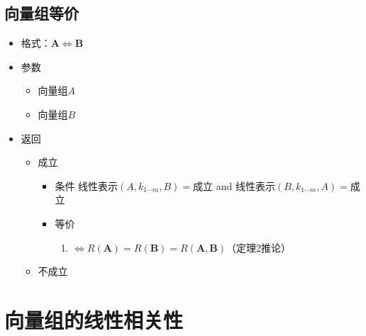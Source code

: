 \documentclass[UTF8,a4paper,12pt,scheme=chinese]{ctexbook}
\begin{document}
	\subsection{向量组等价}
	\begin{itemize}
		\item 格式：$\boldsymbol{A}\Leftrightarrow\boldsymbol{B}$
		\item 参数
		\begin{itemize}
			\item 向量组$A$
			\item 向量组$B$
		\end{itemize}
		\item 返回
		\begin{itemize}
			\item 成立
			\begin{itemize}
				\item 条件
				\subitem 线性表示$(A,k_{1\dotsb m},B)=$成立
				\subitem and
				\subitem 线性表示$(B,k_{1\dotsb m},A)=$成立
				\item 等价
				\begin{enumerate}
					\item $\Leftrightarrow R(\boldsymbol{A})=R(\boldsymbol{B})=R(\boldsymbol{A},\boldsymbol{B})$（定理2推论）
				\end{enumerate}
			\end{itemize}
			
			\item 不成立
		\end{itemize}
	\end{itemize}
	

	\section{向量组的线性相关性}~\\
\end{document}
